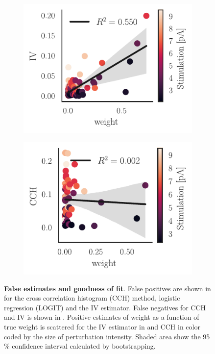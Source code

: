 \documentclass[11pt]{article}
\begin{document}
\begin{figure}
\medskip
\begin{subfigure}{0.46\textwidth} \includegraphics[scale=1]{fit_wald_pos}
\caption{} \label{fig:network-class:3}
\end{subfigure}\hfill
\begin{subfigure}{0.6\textwidth} \includegraphics[scale=1]{fit_cch_pos}
\caption{} \label{fig:network-class:4}
\end{subfigure}
\caption{{\bf False estimates and goodness of fit}. False positives are shown in  for the cross correlation histogram (CCH) method, logistic regression (LOGIT) and the IV estimator. False negatives for CCH and IV is shown in . Positive estimates of weight as a function of true weight is scattered for the IV estimator in  and CCH in  color coded by the size of perturbation intensity. Shaded area show the 95 \% confidence interval calculated by bootstrapping.
\label{fig:network-class}}
\end{figure}
\end{document}
